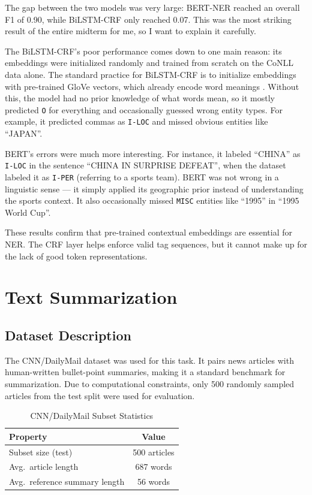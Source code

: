 \documentclass[12pt,a4paper]{article}
\begin{document}
The gap between the two models was very large: BERT-NER reached an overall F1
of 0.90, while BiLSTM-CRF only reached 0.07. This was the most striking result
of the entire midterm for me, so I want to explain it carefully.

The BiLSTM-CRF's poor performance comes down to one main reason: its embeddings
were initialized randomly and trained from scratch on the CoNLL data alone. The
standard practice for BiLSTM-CRF is to initialize embeddings with pre-trained
GloVe vectors, which already encode word meanings \cite{lample2016bilstmcrf}.
Without this, the model had no prior knowledge of what words mean, so it mostly
predicted \texttt{O} for everything and occasionally guessed wrong entity types.
For example, it predicted commas as \texttt{I-LOC} and missed obvious entities
like ``JAPAN''.

BERT's errors were much more interesting. For instance, it labeled ``CHINA'' as
\texttt{I-LOC} in the sentence ``CHINA IN SURPRISE DEFEAT'', when the dataset
labeled it as \texttt{I-PER} (referring to a sports team). BERT was not wrong
in a linguistic sense — it simply applied its geographic prior instead of
understanding the sports context. It also occasionally missed \texttt{MISC}
entities like ``1995'' in ``1995 World Cup''.

These results confirm that pre-trained contextual embeddings are essential for
NER. The CRF layer helps enforce valid tag sequences, but it cannot make up for
the lack of good token representations.

\section{Text Summarization}

\subsection{Dataset Description}

The CNN/DailyMail dataset \cite{hermann2015cnndm} was used for this task.
It pairs news articles with human-written bullet-point summaries, making it a
standard benchmark for summarization. Due to computational constraints, only
500 randomly sampled articles from the test split were used for evaluation.

\begin{table}[H]
    \centering
    \caption{CNN/DailyMail Subset Statistics}
    \begin{tabular}{lc}
        \toprule
        \textbf{Property} & \textbf{Value} \\
        \midrule
        Subset size (test)            & 500 articles \\
        Avg.\ article length          & 687 words \\
        Avg.\ reference summary length & 56 words \\
        \bottomrule
    \end{tabular}
    \label{tab:q3_dataset}
\end{table}
\end{document}
